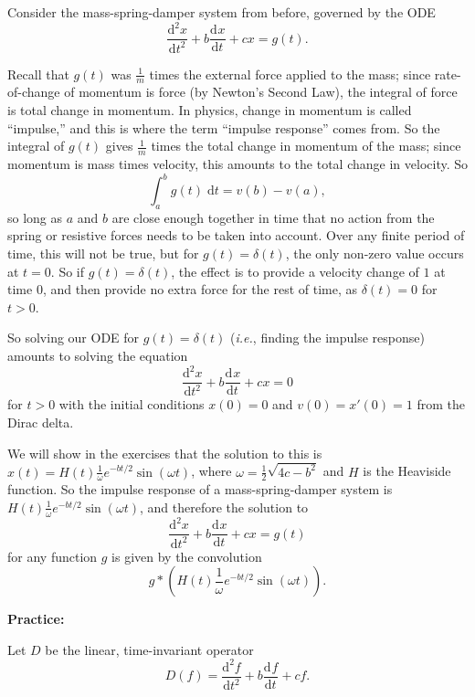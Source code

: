 \documentclass{article}
\newcommand{\deriv}[3][]{\frac{\mathrm{d}^{#1}#2}{\mathrm{d}#3^{#1}}}
\newcommand{\diff}{\;\mathrm{d}}
\begin{document}
Consider the mass-spring-damper system from before, governed by the ODE
\[\deriv[2]{x}{t}+b\deriv{x}{t}+cx=g(t).\]

Recall that $g(t)$ was $\frac{1}{m}$ times the external force applied to the mass; since rate-of-change of momentum is force (by Newton's Second Law), the integral of force is total change in momentum. In physics, change in momentum is called ``impulse,'' and this is where the term ``impulse response'' comes from. So the integral of $g(t)$ gives $\frac{1}{m}$ times the total change in momentum of the mass; since momentum is mass times velocity, this amounts to the total change in velocity. So
\[\int_a^b g(t)\diff t = v(b)-v(a),\]
so long as $a$ and $b$ are close enough together in time that no action from the spring or resistive forces needs to be taken into account. Over any finite period of time, this will not be true, but for $g(t)=\delta(t)$, the only non-zero value occurs at $t=0$. So if $g(t)=\delta(t)$, the effect is to provide a velocity change of $1$ at time 0, and then provide no extra force for the rest of time, as $\delta(t)=0$ for $t>0$.

So solving our ODE for $g(t)=\delta(t)$ (\textit{i.e.}, finding the impulse response) amounts to solving the equation
\[\deriv[2]{x}{t}+b\deriv{x}{t}+cx=0\]
for $t>0$ with the initial conditions $x(0)=0$ and $v(0)=x'(0)=1$ from the Dirac delta.

We will show in the exercises that the solution to this is $x(t)=H(t)\frac{1}{\omega}e^{-bt/2}\sin(\omega t)$, where $\omega = \frac{1}{2}\sqrt{4c-b^2}$ and $H$ is the Heaviside function. So the impulse response of a mass-spring-damper system is $H(t)\frac{1}{\omega}e^{-bt/2}\sin(\omega t)$, and therefore the solution to
\[\deriv[2]{x}{t}+b\deriv{x}{t}+cx=g(t)\]
for any function $g$ is given by the convolution
\[g\ast \left(H(t)\frac{1}{\omega}e^{-bt/2}\sin(\omega t)\right).\]









\clearpage





\textbf{Practice:}\bigskip

Let $D$ be the linear, time-invariant operator
\[D(f)=\deriv[2]{f}{t}+b\deriv{f}{t}+cf.\]
\end{document}
